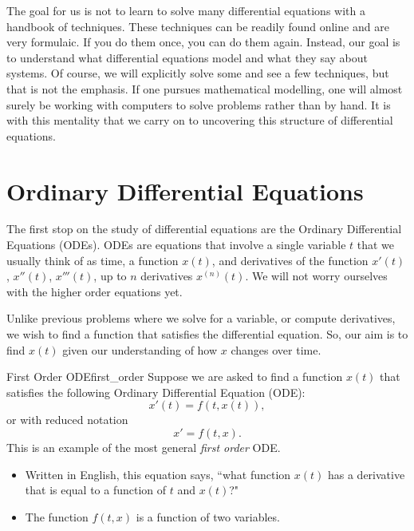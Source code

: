         The goal for us is not to learn to solve many differential equations with a handbook of techniques.  These techniques can be readily found online and are very formulaic.  If you do them once, you can do them again.  Instead, our goal is to understand what differential equations model and what they say about systems.  Of course, we will explicitly solve some and see a few techniques, but that is not the emphasis.  If one pursues mathematical modelling, one will almost surely be working with computers to solve problems rather than by hand. It is with this mentality that we carry on to uncovering this structure of differential equations.
        
        \section{Ordinary Differential Equations}
        
        The first stop on the study of differential equations are the Ordinary Differential Equations  (ODEs).  ODEs are equations that involve a single variable $t$ that we usually think of as time, a function $x(t)$, and derivatives of the function $x'(t)$, $x''(t)$, $x'''(t)$, up to $n$ derivatives $x^{(n)}(t)$.  We will not worry ourselves with the higher order equations yet.
        
        Unlike previous problems where we solve for a variable, or compute derivatives, we wish to find a function that satisfies the differential equation.  So, our aim is to find $x(t)$ given our understanding of how $x$ changes over time.
        
        \begin{ex}{First Order ODE}{first_order}
        Suppose we are asked to find a function $x(t)$ that satisfies the following Ordinary Differential Equation (ODE):
        \[
        x'(t) = f(t,x(t)),
        \]
        or with reduced notation
        \[
        x'=f(t,x).
        \]
        This is an example of the most general \emph{first order} ODE. 
        \begin{itemize}
            \item Written in English, this equation says, ``what function $x(t)$ has a derivative that is equal to a function of $t$ and $x(t)$?"
            \item The function $f(t,x)$ is a function of two variables. 
        \end{itemize}
        \end{ex}
        
